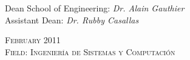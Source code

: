 \begin{center}
\begin{tabbing}
  \hspace{1cm}Dean School of Engineering: \> {\itshape Dr. Alain Gauthier} \\
  \hspace{1cm}Assistant Dean: \> {\itshape Dr. Rubby Casallas}
\end{tabbing}

\vfill

{%
  \normalsize\scshape
  February 2011\\
  {\scshape%
  Field: Ingenier\'{i}a de Sistemas y Computaci\'{o}n
  }
}

\end{center}



\endinput 